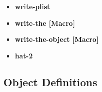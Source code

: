 \documentclass [11pt]{book}
\begin{document}
\begin{itemize}
\item {}
\label{prim:write-plist}
\textbf{write-plist}





\item {}
\label{prim:write-the}
\textbf{write-the [Macro]}





\item {}
\label{prim:write-the-object}
\textbf{write-the-object [Macro]}





\item {}
\label{prim:hat-2}
\textbf{hat-2}





\end{itemize}



\subsection{Object Definitions}

\label{subsec:objectdefinitions}
\end{document}
